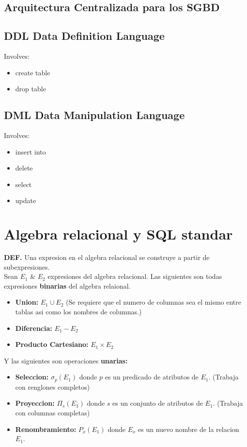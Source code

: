 \documentclass[twoside]{article}
\begin{document}
\subsection{Arquitectura Centralizada para los SGBD}

\subsection{DDL Data Definition Language}
Involves:
\begin{itemize}
	\item create table
	\item drop table
\end{itemize}

\subsection{DML Data Manipulation Language}
Involves:
\begin{itemize}
	\item insert into
	\item delete
	\item select
	\item update
\end{itemize}
\section{Algebra relacional y SQL standar}
\textbf{DEF.} Una expresion en el algebra relacional se construye a partir de subexpresiones.\\

Sean $E_1$ \& $E_2$ expresiones del algebra relacional. Las siguientes son todas expresiones \textbf{binarias} del algebra relaional.\\

\begin{itemize}
  \item \textbf{Union:} $E_1 \cup E_2$ (Se requiere que el numero de columnas sea el mismo entre tablas asi como los nombres de columnas.)
  \item \textbf{Diferencia:} $E_1 - E_2$
  \item \textbf{Producto Cartesiano:} $E_1 \times E_2$
\end{itemize}

Y las siguientes son operaciones \textbf{unarias:}\\

\begin{itemize}
  \item \textbf{Seleccion:} $\sigma_p(E_1)$ donde $p$ es un predicado de atributos de $E_1$. (Trabaja con renglones completos)\\
  \item \textbf{Proyeccion:} $\Pi_s(E_1)$ donde $s$ es un conjunto de atributos de $E_1$. (Trabaja con columnas completas)\\
  \item \textbf{Renombramiento:} $P_x(E_1)$ donde $E_x$ es un nuevo nombre de la relacion $E_1$.
\end{itemize}
\end{document}

